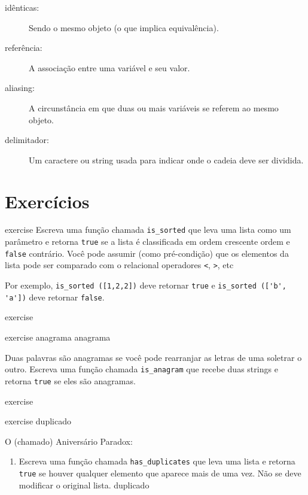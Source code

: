 \documentclass[10pt]{book}
\begin{document}
\begin{exercise}
\begin{description}
\item[idênticas:] Sendo o mesmo objeto (o que implica equivalência).

\item[referência:] A associação entre uma variável e seu valor.

\item[aliasing:] A circunstância em que duas ou mais variáveis ​​se referem ao mesmo
objeto.

\item[delimitador:] Um caractere ou string usada para indicar onde o
cadeia deve ser dividida.

\end{description}


\section{Exercícios}

\begin{} exercise
Escreva uma função chamada \verb "is_sorted" que leva uma lista como um
parâmetro e retorna {\tt true} se a lista é classificada em ordem crescente
ordem e {\tt false} contrário. Você pode assumir (como pré-condição)
que os elementos da lista pode ser comparado com o relacional
operadores {\tt <}, {\tt>}, etc

Por exemplo, \verb "is_sorted ([1,2,2])" deve retornar {\tt true}
e \verb "is_sorted (['b', 'a'])" deve retornar {\tt false}.
\end{} exercise


\begin{} exercise
\label{} anagrama
\index{} anagrama

Duas palavras são anagramas se você pode rearranjar as letras de uma
soletrar o outro. Escreva uma função chamada \verb "is_anagram"
que recebe duas strings e retorna {\tt true} se eles são anagramas.
\end{} exercise


\begin{} exercise
\label{} duplicado

O (chamado) Aniversário Paradox:

\begin{enumerate}

\item Escreva uma função chamada \verb "has_duplicates" que leva
uma lista e retorna {\tt true} se houver qualquer elemento que
aparece mais de uma vez. Não se deve modificar o original
lista.
\index{} duplicado


\end{enumerate}
\end{}
\end{exercise}
\end{document}
